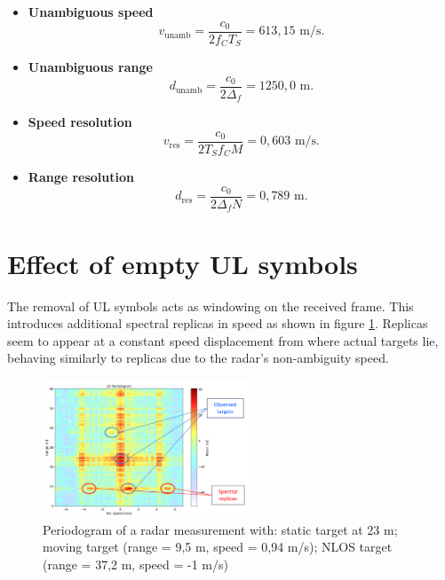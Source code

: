 \begin{itemize}
    \item \textbf{Unambiguous speed}
     \vspace{-\baselineskip} %
            \begin{equation}
                v_{\text{unamb}} = \frac{c_0}{2f_C T_S} = 613,15\text{ m/s}.
            \end{equation}
           
     \item \textbf{Unambiguous range}
            \begin{equation}
                d_{\text{unamb}} = \frac{c_0}{2\Delta_f} = 1250,0\text{ m}.
            \end{equation}
     \item \textbf{Speed resolution}
            \begin{equation}
                v_{\text{res}} = \frac{c_0}{2T_Sf_CM} = 0,603 \text{ m/s}.
            \end{equation} 
     \item \textbf{Range resolution}
            \begin{equation}
                d_{\text{res}} = \frac{c_0}{2\Delta_fN} = 0,789 \text{ m}.
            \end{equation}  
\end{itemize}



\section{Effect of empty UL symbols}
    
    The removal of UL symbols acts as windowing on the received frame. This introduces additional spectral replicas in speed as shown in figure \ref{fig:SpectralReplicasDLULpattern}. Replicas seem to appear at a constant speed displacement from where actual targets lie, behaving similarly to replicas due to the radar's non-ambiguity speed.
    
    \begin{figure}[H]
        \centering
        \includegraphics[width=0.55\textwidth]{Images/TDDprocessing/SpectralReplicasDLULpattern.png}
        \caption{Periodogram of a radar measurement with: static target at 23 m; moving target (range = 9,5 m, speed = 0,94 m/s); NLOS target (range = 37,2 m, speed = -1 m/s)}
        \label{fig:SpectralReplicasDLULpattern}
    \end{figure}
    
